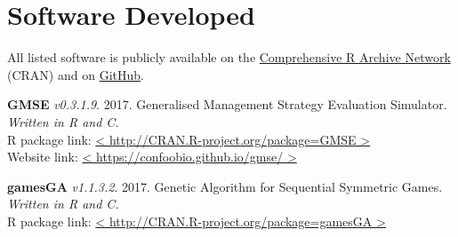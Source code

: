 \documentclass[letterpaper]{article}
\begin{document}
\section*{Software Developed}

All listed software is publicly available on the \href{https://cran.r-project.org/}{Comprehensive R Archive Network} (CRAN) and on \href{https://github.com/bradduthie}{GitHub}.

\begin{etaremune}
\item {\bf GMSE} {\it v0.3.1.9}. 2017. Generalised Management Strategy Evaluation Simulator. {\it Written in R and C.} \\
R package link: \href{http://CRAN.R-project.org/package=GMSE}{< http://CRAN.R-project.org/package=GMSE >} \\
Website link: \href{https://confoobio.github.io/gmse/}{< https://confoobio.github.io/gmse/ >}
\item {\bf gamesGA} {\it v1.1.3.2}. 2017. Genetic Algorithm for Sequential Symmetric Games. {\it Written in R and C.} \\
R package link: \href{http://CRAN.R-project.org/package=gamesGA}{< http://CRAN.R-project.org/package=gamesGA >}
\end{etaremune}
\end{document}
